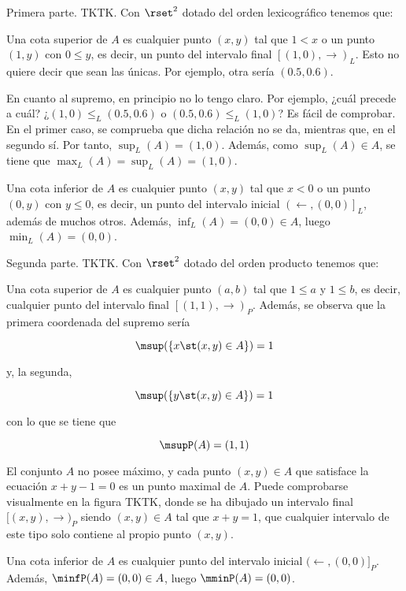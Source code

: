 Primera parte. TKTK. Con $\rset^2$ dotado del orden lexicográfico
tenemos que: 

Una cota superior de $A$ es cualquier punto $(x, y)$ tal que $1 < x$ o un
punto $(1, y)$ con $0 \leq y$, es decir, un punto del intervalo final
$\left[(1, 0), \to\right)_L$. Esto no quiere decir que sean las únicas. Por
ejemplo, otra sería $(0.5, 0.6)$.

En cuanto al supremo, en principio no lo tengo claro. Por ejemplo, ¿cuál
precede a cuál? ¿$(1, 0) \leq_L (0.5, 0.6)$ o $(0.5, 0.6) \leq_L (1, 0)$? Es
fácil de comprobar. En el primer caso, se comprueba que dicha relación no se
da, mientras que, en el segundo sí. Por tanto, $\sup_L(A) = (1, 0)$. Además,
como $\sup_L(A) \in A$, se tiene que $\max_L(A) = \sup_L(A) = (1, 0)$.


Una cota inferior de $A$ es cualquier punto $(x, y)$ tal que $x < 0$ o un
punto $(0, y)$ con $y \leq 0$, es decir, un punto del intervalo inicial
$\left(\leftarrow, (0, 0)\right]_L$, además de muchos otros. Además,
$\inf_L(A) = (0, 0) \in A$, luego $\min_L(A) = (0, 0)$.

Segunda parte. TKTK. Con $\rset^2$ dotado del orden producto tenemos
que:

Una cota superior de $A$ es cualquier punto $(a, b)$ tal que $1 \leq a$ y $1
\leq b$, es decir, cualquier punto del intervalo final $\left[(1, 1),
\to\right)_P$. Además, se observa que la primera coordenada del supremo
sería

$$ \msup(\{x \st (x, y) \in A\}) = 1 $$

\noindent y, la segunda,

$$ \msup(\{y \st (x, y) \in A\}) = 1 $$

\noindent con lo que se tiene que

$$ \msupP(A) = (1, 1) $$

El conjunto $A$ no posee máximo, y cada punto $(x, y) \in A$ que satisface
la ecuación $x + y - 1 = 0$ es un punto maximal de $A$. Puede comprobarse
visualmente en la figura TKTK, donde se ha dibujado un intervalo final $[(x,
y), \rightarrow)_P$ siendo $(x, y) \in A$ tal que $x + y = 1$, que cualquier
intervalo de este tipo solo contiene al propio punto $(x, y)$.

Una cota inferior de $A$ es cualquier punto del intervalo inicial
$(\leftarrow, (0, 0)]_P$. Además, $\minfP(A) = (0, 0) \in A$, luego
$\mminP(A) = (0, 0)$.

